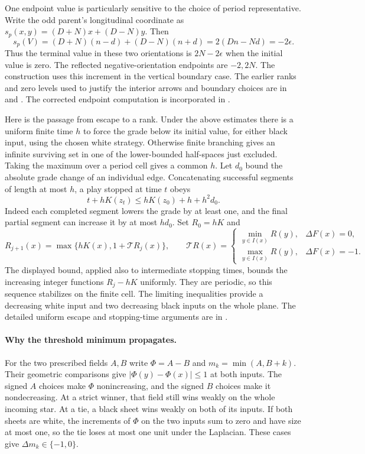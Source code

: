 \documentclass[11pt]{article}
\begin{document}
One endpoint value is particularly sensitive to the choice of period representative. Write the odd parent's longitudinal coordinate as $s_p(x,y)=(D+N)x+(D-N)y$. Then
\[
 s_p(V)=(D+N)(n-d)+(D-N)(n+d)=2(Dn-Nd)=-2\epsilon .
\]
Thus the terminal value in these two orientations is $2N-2\epsilon$ when the initial value is zero. The reflected negative-orientation endpoints are $-2,2N$. The construction uses this increment in the vertical boundary case. The earlier ranks and zero levels used to justify the interior arrows and boundary choices are in  and . The corrected endpoint computation is incorporated in .

Here is the passage from escape to a rank. Under the above estimates there is a uniform finite time $h$ to force the grade below its initial value, for either black input, using the chosen white strategy. Otherwise finite branching gives an infinite surviving set in one of the lower-bounded half-spaces just excluded. Taking the maximum over a period cell gives a common $h$. Let $d_0$ bound the absolute grade change of an individual edge. Concatenating successful segments of length at most $h$, a play stopped at time $t$ obeys
\[
                 t+hK(z_t)\le hK(z_0)+h+h^2d_0 .
\]
Indeed each completed segment lowers the grade by at least one, and the final partial segment can increase it by at most $h d_0$. Set $R_0=hK$ and
\[
 R_{j+1}(x)=\max\{hK(x),1+\mathcal T R_j(x)\},\qquad
 \mathcal T R(x)=
 \begin{cases}
 \min_{y\in I(x)}R(y),&\Delta F(x)=0,\\
 \max_{y\in I(x)}R(y),&\Delta F(x)=-1 .
 \end{cases}
\]
The displayed bound, applied also to intermediate stopping times, bounds the increasing integer functions $R_j-hK$ uniformly. They are periodic, so this sequence stabilizes on the finite cell. The limiting inequalities provide a decreasing white input and two decreasing black inputs on the whole plane. The detailed uniform escape and stopping-time arguments are in .

\paragraph{Why the threshold minimum propagates.}
For the two prescribed fields $A,B$ write $\Phi=A-B$ and $m_k=\min(A,B+k)$. Their geometric comparisons give $|\Phi(y)-\Phi(x)|\le1$ at both inputs. The signed $A$ choices make $\Phi$ nonincreasing, and the signed $B$ choices make it nondecreasing. At a strict winner, that field still wins weakly on the whole incoming star. At a tie, a black sheet wins weakly on both of its inputs. If both sheets are white, the increments of $\Phi$ on the two inputs sum to zero and have size at most one, so the tie loses at most one unit under the Laplacian. These cases give $\Delta m_k\in\{-1,0\}$.
\end{document}
